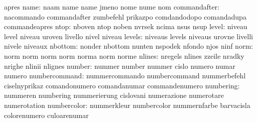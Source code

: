                            apres
                     name: naam                      name
                           name                      jmeno
                           nome                      nume
                           nom
             commandafter: nacommando                commandafter
                           zumbefehl                 prikazpo
                           comdandodopo              comandadupa
                           commandeapres
                     ntop: nboven                    ntop
                           noben                     nvrsek
                           ncima                     nsus
                           nsup
                    level: niveau                    level
                           niveau                    uroven
                           livello                   nivel
                           niveau
                   levels: niveaus                   levels
                           niveaus                   urovne
                           livelli                   nivele
                           niveaux
                  nbottom: nonder                    nbottom
                           nunten                    nspodek
                           nfondo                    njos
                           ninf
                     norm: norm                      norm
                           norm                      norm
                           norma                     norm
                           norme
                   nlines: nregels                   nlines
                           zzeile                    nradky
                           nrighe                    nlinii
                           nlignes
                   number: nummer                    number
                           nummer                    cislo
                           numero                    numar
                           numero
            numbercommand: nummercommando            numbercommand
                           nummerbefehl              ciselnyprikaz
                           comandonumero             comandanumar
                           commandenumero
                numbering: nummeren                  numbering
                           nummerierung              cislovani
                           numerazione               numerotare
                           numerotation
              numbercolor: nummerkleur               numbercolor
                           nummernfarbe              barvacisla
                           colorenumero              culoarenumar
